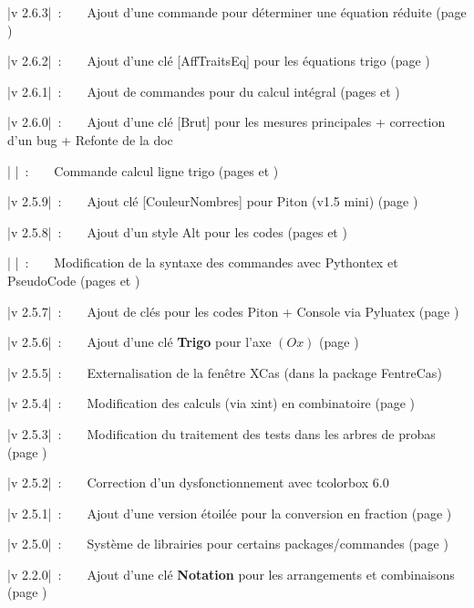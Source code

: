 \documentclass[a4paper,french,11pt]{article}
\newcommand\Cle[1]{{\bfseries\sffamily\textlangle #1\textrangle}}
\begin{document}
{\small \bverb|v 2.6.3|~:~~~~Ajout d'une commande pour déterminer une équation réduite (page \pageref{eqreduite})

{\small \bverb|v 2.6.2|~:~~~~Ajout d'une clé [AffTraitsEq] pour les équations trigo (page \pageref{cercletrigo})

{\small \bverb|v 2.6.1|~:~~~~Ajout de commandes pour du calcul intégral (pages \pageref{calcintegr} et \pageref{integrtikz})

{\small \bverb|v 2.6.0|~:~~~~Ajout d'une clé [Brut] pour les mesures principales + correction d'un bug} + Refonte de la doc

{\small \bverb|       |~:~~~~Commande calcul ligne trigo (pages \pageref{mesureprincipale} et \pageref{lignestrigo})

{\small \bverb|v 2.5.9|~:~~~~Ajout clé [CouleurNombres] pour \textsf{Piton} (v1.5 mini) (page \pageref{pythonpiton})

{\small \bverb|v 2.5.8|~:~~~~Ajout d'un style \textsf{Alt} pour les codes (pages \pageref{pythonsimple} et \pageref{pytminted})

{\small \bverb|       |~:~~~~Modification de la syntaxe des commandes avec \textsf{Pythontex} et \textsf{PseudoCode} (pages \pageref{pythontex} et \pageref{pseudocode})

{\small \bverb|v 2.5.7|~:~~~~Ajout de clés pour les codes \textsf{Piton} + Console via \textsf{Pyluatex} (page \pageref{pythonpiton})

{\small \bverb|v 2.5.6|~:~~~~Ajout d'une clé \Cle{Trigo} pour l'axe $(Ox)$ (page \pageref{reperagetikz})

{\small \bverb|v 2.5.5|~:~~~~Externalisation de la fenêtre XCas (dans la package \textsf{FentreCas})

{\small \bverb|v 2.5.4|~:~~~~Modification des calculs (via \textsf{xint}) en combinatoire (page \pageref{combinatoire})

{\small \bverb|v 2.5.3|~:~~~~Modification du traitement des tests dans les arbres de probas (page \pageref{arbresprobas})

{\small \bverb|v 2.5.2|~:~~~~Correction d'un dysfonctionnement avec \textsf{tcolorbox 6.0}

{\small \bverb|v 2.5.1|~:~~~~Ajout d'une version étoilée pour la conversion en fraction (page \pageref{convfrac})

{\small \bverb|v 2.5.0|~:~~~~Système de \textsf{librairies} pour certains packages/commandes (page \pageref{librairies})

{\small \bverb|v 2.2.0|~:~~~~Ajout d'une clé \Cle{Notation} pour les arrangements et combinaisons (page \pageref{combinatoire})

}}}}}}}}}}}}}}}}
\end{document}
